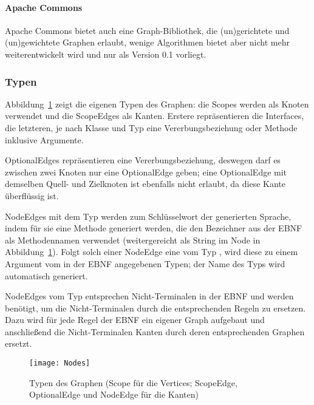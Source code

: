 \documentclass[../InterneDSLs.tex]{subfiles}
\begin{document}
\paragraph{Apache Commons}
Apache Commons bietet auch eine Graph-Bibliothek, die (un)gerichtete und (un)gewichtete Graphen erlaubt, wenige Algorithmen bietet aber nicht mehr weiterentwickelt wird und nur als Version 0.1 vorliegt.

\subsubsection{Typen}
Abbildung~\ref{FIG:GraphTypes} zeigt die eigenen Typen des Graphen: die Scopes werden als Knoten verwendet und die ScopeEdges als Kanten. Erstere repräsentieren die Interfaces, die letzteren, je nach Klasse und Typ eine Vererbungsbeziehung oder Methode inklusive Argumente.

OptionalEdges repräsentieren eine Vererbungsbeziehung, deswegen darf es zwischen zwei Knoten nur eine OptionalEdge geben; eine OptionalEdge mit demselben Quell- und Zielknoten ist ebenfalls nicht erlaubt, da diese Kante überflüssig ist.

NodeEdges mit dem Typ  werden zum Schlüsselwort der generierten Sprache, indem für sie eine Methode generiert werden, die den Bezeichner aus der EBNF als Methodennamen verwendet (weitergereicht als String im Node in Abbildung~\ref{FIG:GraphTypes}). Folgt solch einer NodeEdge eine vom Typ , wird diese zu einem Argument vom in der EBNF angegebenen Typen; der Name des Typs wird automatisch generiert.

NodeEdges vom Typ  entsprechen Nicht-Terminalen in der EBNF und werden benötigt, um die Nicht-Terminalen durch die entsprechenden Regeln zu ersetzen. Dazu wird für jede Regel der EBNF ein eigener Graph aufgebaut und anschließend die Nicht-Terminalen Kanten durch deren entsprechenden Graphen ersetzt.
\begin{figure}[ht]
\centering
\texttt{[image: Nodes]}
\caption[Typen des Graphen]{Typen des Graphen (Scope für die Vertices; ScopeEdge, OptionalEdge und NodeEdge für die Kanten)}
\label{FIG:GraphTypes}
\end{figure}
\end{document}
